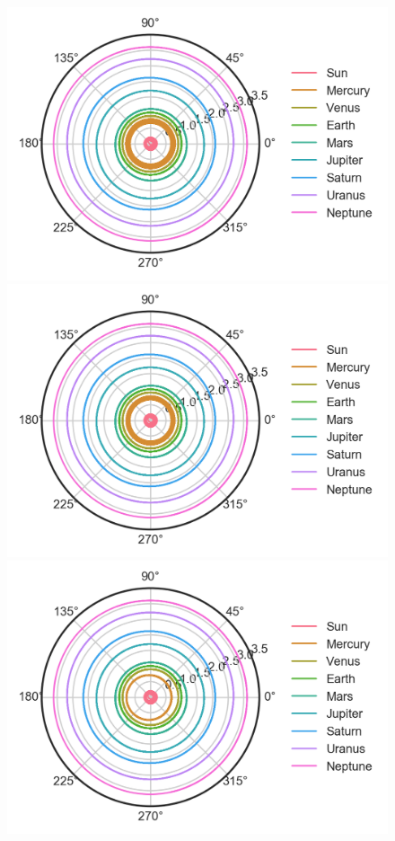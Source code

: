 \documentclass[aps,prc,reprint]{revtex4-1}
\begin{document}
        \begin{figure}
            \includegraphics{planets_euler.png}
            \includegraphics{planets_verlet.png}
            \includegraphics{planets_rk4.png}

\end{figure}
\end{document}
